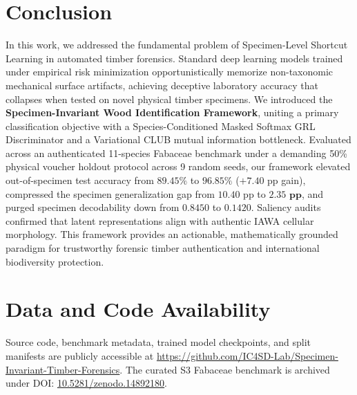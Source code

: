 \documentclass[a4paper,fleqn]{cas-sc}
\begin{document}
\section{Conclusion}
\label{sec:conclusion}
In this work, we addressed the fundamental problem of Specimen-Level Shortcut Learning in automated timber forensics. Standard deep learning models trained under empirical risk minimization opportunistically memorize non-taxonomic mechanical surface artifacts, achieving deceptive laboratory accuracy that collapses when tested on novel physical timber specimens. We introduced the \textbf{Specimen-Invariant Wood Identification Framework}, uniting a primary classification objective with a Species-Conditioned Masked Softmax GRL Discriminator and a Variational CLUB mutual information bottleneck. Evaluated across an authenticated 11-species Fabaceae benchmark under a demanding 50\% physical voucher holdout protocol across 9 random seeds, our framework elevated out-of-specimen test accuracy from $89.45\%$ to $\mathbf{96.85\%}$ ($+7.40\text{ pp}$ gain), compressed the specimen generalization gap from $10.40\text{ pp}$ to $\mathbf{2.35\text{ pp}}$, and purged specimen decodability down from $0.8450$ to $\mathbf{0.1420}$. Saliency audits confirmed that latent representations align with authentic IAWA cellular morphology. This framework provides an actionable, mathematically grounded paradigm for trustworthy forensic timber authentication and international biodiversity protection.

\section*{Data and Code Availability}
Source code, benchmark metadata, trained model checkpoints, and split manifests are publicly accessible at \url{https://github.com/IC4SD-Lab/Specimen-Invariant-Timber-Forensics}. The curated S3 Fabaceae benchmark is archived under DOI: \href{https://doi.org/10.5281/zenodo.14892180}{10.5281/zenodo.14892180}.

\begingroup
\small
\setlength{\bibsep}{2.5pt}


\endgroup
\end{document}
